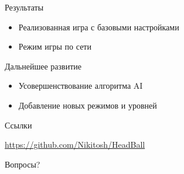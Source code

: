 \documentclass[12pt]{beamer}
\begin{document}
\begin{frame}{Результаты}

    \begin{itemize}
    
        \item <1-> Реализованная игра с базовыми настройками 

        \item <2-> Режим игры по сети 

    \end{itemize}

\end{frame}

\begin{frame}{Дальнейшее развитие}
    \begin{itemize}
        \item <1-> Усовершенствование алгоритма AI

        \item <2-> Добавление новых режимов и уровней         
    \end{itemize}

\end{frame}       

\begin{frame}{Ссылки}

    \url{https://github.com/Nikitosh/HeadBall}

\end{frame}

\begin{frame}{}

    Вопросы?

\end{frame}
\end{document}
